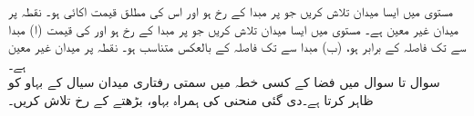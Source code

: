 مستوی  میں ایسا میدان  تلاش کریں جو   پر مبدا کے رخ ہو اور اس کی مطلق قیمت اکائی ہو۔  نقطہ  پر میدان غیر معین ہے۔
مستوی  میں ایسا میدان  تلاش کریں جو   پر مبدا کے رخ ہو اور    کی قیمت  (ا) مبدا سے   تک فاصلہ کے برابر ہو، (ب) مبدا سے   تک فاصلہ کے بالعکس متناسب ہو۔ نقطہ  پر میدان غیر معین ہے۔
\\
سوال  تا سوال  میں فضا کے کسی خطہ میں سمتی رفتاری میدان  سیال کے بہاو کو ظاہر کرتا ہے۔دی گئی منحنی کی ہمراہ بہاو، بڑھتے  کے رخ  تلاش کریں۔

